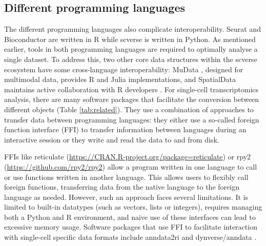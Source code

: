 \documentclass[unnumsec,webpdf,modern,large,namedate]{oup-authoring-template}%
\begin{document}
\subsection{Different programming languages}\label{proglang}
The different programming languages also complicate interoper\-abi\-lity. 
Seurat and Bioconductor are written in R while scverse is written in Python. 
As mentioned earlier, tools in both program\-ming languages are required to optimally analyse a single dataset.
To address this, two other core data structures within the scverse ecosystem have some cross-language interoperability: MuData \citep{muon}, designed for multimodal data, provides R and Julia implementations, and SpatialData \citep{spatialdata} maintains active collaboration with R developers \citep{hackathon}.
For single-cell transcriptomics analysis, there are many software packages that facilitate the conversion between different objects (Table \ref{tab:related}).
They use a com\-bi\-na\-tion of approaches to transfer data between programming languages: they either use a so-called foreign function interface (FFI) to transfer information between languages during an interac\-tive session or they write and read the data to and from disk.

FFIs like reticulate (\url{https://CRAN.R-project.org/package=reticulate}) or rpy2 (\url{https://github.com/rpy2/rpy2}) allow 
a program written in one language to call or use functions written in another language. 
This allows users to flexibly call foreign functions, transferring data from the native language 
to the foreign language as needed. However, such an approach faces several limitations. It is 
limited to built-in datatypes (such as vectors, lists or integers), requires managing both a Python and R environment, and naive use of 
these interfaces can lead to excessive memory usage. 
Software packages that use FFI to facilitate interaction with single-cell specific data formats include anndata2ri \citep{anndata2ri} and dynverse/anndata \citep{dynverseanndata}.
\end{document}
